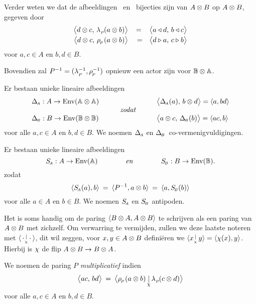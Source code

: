 \documentclass{book}
\begin{document}
Verder weten we dat de afbeeldingen\/ \lp\ en\/ \rp\ bijecties zijn van\/
$A \tens B$ op\/ $A \tens B$, gegeven door
$$ \begin{array}{rcl}
   \pairM{d \tens c}{\lp(a \tens b)} &=& \pairM{a \ract d}{b \ract c}
     \\
     \pairM{d \tens c}{\rp(a \tens b)} &\vertL=& \pairM{d \lact a}{c \lact b}
   \end{array} $$
voor $a,c \in A$ en $b,d \in B$.

Bovendien zal $P^{-1} = (\lp^{-1},\rp^{-1})$ opnieuw een actor zijn voor $\BBAA$.



\begin{prop}
Er bestaan unieke lineaire afbeeldingen
$$ \begin{array}{lcl}
   \DeltaA : A \rarr \Env(\AAAA)  & &  \pairM{\DeltaA(a)}{b \tens d} = \pair{a}{bd}
   \\
   &\hspace{2em} \mbox{\it  zodat} \hspace{2em}& \\
   \DeltaB : B \rarr \Env(\BBBB)  & &  \pairM{a \tens c}{\DeltaB(b)} = \pair{ac}{b}
   \end{array} $$
voor alle\/ $a,c \in A$ en\/ $b,d \in B$.
{\rm We noemen $\DeltaA$ en $\DeltaB$}\ co-vermenigvuldigingen.
\end{prop}



\begin{prop}
Er bestaan unieke lineaire afbeeldingen
$$ \SA : A \rarr \Env(\Aa)     \itandspace{4em}
   \SB : B \rarr \Env(\BB). $$
zodat
$$ \pair{\SA(a)}{b} \:=\: \pair{P^{-1}}{a \tens b} \:=\: \pair{a}{\SB(b)}$$
voor alle\/ $a \in A$ en\/ $b \in B$.
{\rm We noemen $\SA$ en $\SB$} antipoden.
\end{prop}

Het is soms handig om de paring $\pair{B \tens A}{A \tens B}$ te schrijven als
een paring van $A \tens B$ met zichzelf.
Om verwarring te vermijden, zullen we deze laatste noteren met $\pairflip{\,\cdot}{\cdot\,}$,
dit wil zeggen, voor $x,y \in A \tens B$ defini\"eren we $\pairflip{x}{y} = \pair{\flip(x)}{y}$.
Hierbij is $\flip$ de flip $A \tens B \rarr B \tens A$.


\begin{defn} \rm
We noemen de paring $P$ {\em multiplicatief\/} indien
$$ \pairM{ac}{bd} \:=\: \pairflipM{\rp(a \tens b)}{\lp(c\tens d)}$$
voor alle $a,c \in A$ en $b,d \in B$.
\end{defn}
\end{document}
